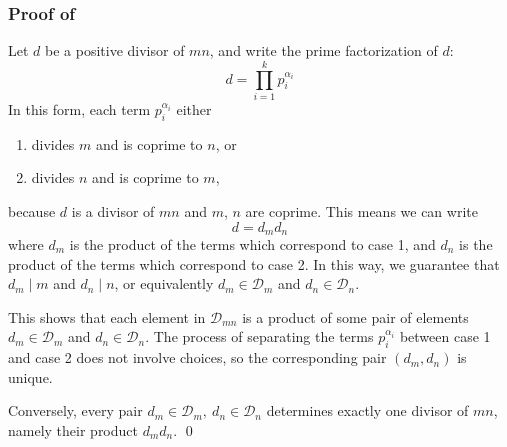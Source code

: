 \documentclass[a4paper, 12pt]{article}
\theoremstyle{definition}
\begin{document}
\subsubsection*{Proof of }
Let $d$ be a positive divisor of $mn$, and write the prime factorization of $d$:
\begin{equation}
  d=\prod_{i=1}^{k}p_i^{\alpha_i}
\end{equation}
In this form, each term $p_i^{\alpha_i}$ either
\vspace{-1em}\begin{enumerate}
  \item divides $m$ and is coprime to $n$, or
  \item divides $n$ and is coprime to $m$,
\end{enumerate}\vspace{-0.5em}
because $d$ is a divisor of $mn$ and $m$, $n$ are coprime.
This means we can write
\begin{equation}
  d=d_m d_n
\end{equation}
where $d_m$ is the product of the terms which correspond
to case 1, and $d_n$ is the product of the terms
which correspond to case 2.
In this way, we guarantee that $d_m \mid m$ and $d_n \mid n$, or equivalently $d_m \in \mathcal{D}_m$ and $d_n \in \mathcal{D}_n$.

This shows that each element in $\mathcal{D}_{mn}$ is a product of some pair of elements $d_m \in \mathcal{D}_m$ and $d_n \in \mathcal{D}_n$.
The process of separating the terms $p_i^{\alpha_i}$ between case 1 and case 2 does not involve choices, so the corresponding pair $(d_m, d_n)$ is unique.

Conversely, every pair $d_m \in \mathcal{D}_m,\ d_n \in \mathcal{D}_n$ determines exactly one divisor of $mn$, namely their product $d_m d_n$.
\qed\vspace{1em}
\end{document}
